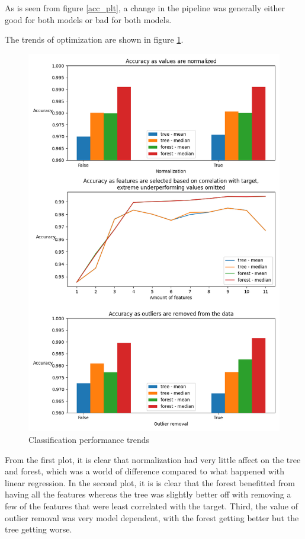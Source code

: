 \documentclass[12pt, letterpaper]{article}
\begin{document}
As is seen from figure \ref{acc_plt}, a change in the pipeline was generally either good for both models or bad for both models.

The trends of optimization are shown in figure \ref{cls_plt}.

\begin{figure}[H]
    \centering
    \includegraphics[scale=0.7]{classification_performance.png}
    \caption{Classification performance trends}
    \label{cls_plt} %
\end{figure}

From the first plot, it is clear that normalization had very little affect on the tree and forest, which was a world of difference compared to what happened with linear regression. In the second plot, it is is clear that the forest benefitted from having all the features whereas the tree was slightly better off with removing a few of the features that were least correlated with the target. Third, the value of outlier removal was very model dependent, with the forest getting better but the tree getting worse.
\end{document}
